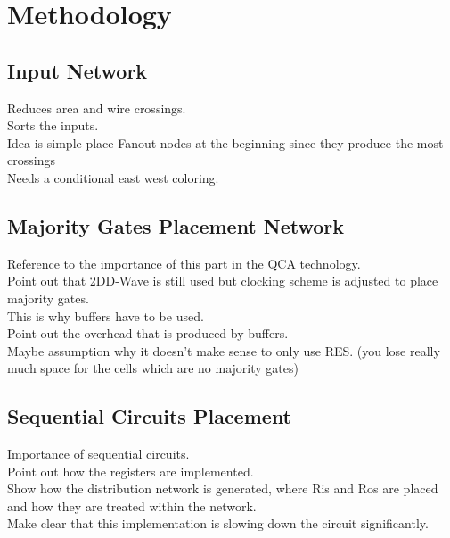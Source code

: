 \chapter{Methodology}\label{chapter:Methodology}

\section{Input Network}
Reduces area and wire crossings.\\
Sorts the inputs.\\
Idea is simple place Fanout nodes at the beginning since they produce the most crossings\\
Needs a conditional east west coloring.\\

\section{Majority Gates Placement Network}
Reference to the importance of this part in the QCA technology. \\
Point out that 2DD-Wave is still used but clocking scheme is adjusted to place majority gates.\\
This is why buffers have to be used.\\
Point out the overhead that is produced by buffers.\\
Maybe assumption why it doesn't make sense to only use RES. (you lose really much space for the cells which are no majority gates)


\section{Sequential Circuits Placement}

Importance of sequential circuits.\\
Point out how the registers are implemented.\\
Show how the distribution network is generated, where Ris and Ros are placed and how they are treated within the network.\\
Make clear that this implementation is slowing down the circuit significantly.